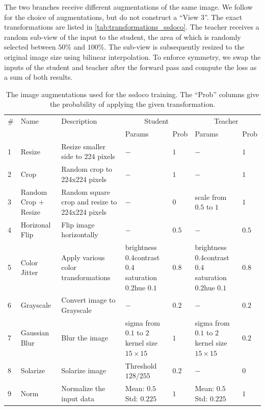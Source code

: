 The two branches receive different augmentations of the same image. We follow \cite{Wei:2021aaa} for the choice of augmentations, but do not construct a “View 3”. The exact transformations are listed in \autoref{tab:transformations_ssdoco}. The teacher receives a random sub-view of the input to the student, the area of which is randomly selected between $50\%$ and $100\%$. The sub-view is subsequently resized to the original image size using bilinear interpolation. To enforce symmetry, we swap the inputs of the student and teacher after the forward pass and compute the loss as a sum of both results.
\begin{table}
\begin{tabularx}{\textwidth}{|p{}|X|p{}|X|p{}|X|p{}|}
\hline
\# & Name & Description & \multicolumn{2}{c|}{Student} & \multicolumn{2}{c|}{Teacher}\\
\cline{4-7}
& & & Params & Prob & Params & Prob \\
\hline
1 & Resize & Resize smaller side to 224 pixels & $-$ & $1$ & $-$ & $1$ \\
\hline
2 & Crop & Random crop to 224x224 pixels & $-$ & $1$ & $-$ & $1$ \\
\hline
3 & Random Crop + Resize & Random square crop and resize to 224x224 pixels & $-$ & $0$ & scale from $0.5$ to $1$ & $1$ \\
\hline
4 & Horizonal Flip & Flip image horizontally & $-$ & $0.5$ & $-$ & $0.5$ \\
\hline
5 & Color Jitter & Apply various color transformations & brightness $0.4$\newline contrast $0.4$\newline saturation $0.2$\newline hue $0.1$ & $0.8$ & brightness $0.4$\newline contrast $0.4$\newline saturation $0.2$\newline hue $0.1$ & $0.8$ \\
\hline
6 & Grayscale & Convert image to Grayscale & $-$ & $0.2$ & $-$ & $0.2$ \\
\hline
7 & Gaussian Blur & Blur the image & sigma from $0.1$ to $2$ kernel size $15\times 15$ & $1$ & sigma from $0.1$ to $2$ kernel size $15\times 15$ & $0.2$ \\
\hline
8 & Solarize & Solarize image & Threshold $128/255$ & $0.2$ & $-$ & $0$ \\
\hline
9 & Norm & Normalize the input data & Mean: $0.5$\newline Std: $0.225$ & $1$ & Mean: $0.5$\newline Std: $0.225$ & $1$ \\
\hline
\end{tabularx}
\caption[Transformations]{The image augmentations used for the \acrshort{ssdoco} training. The ``Prob'' columns give the probability of applying the given transformation.}\label{tab:transformations_ssdoco}
\end{table}

